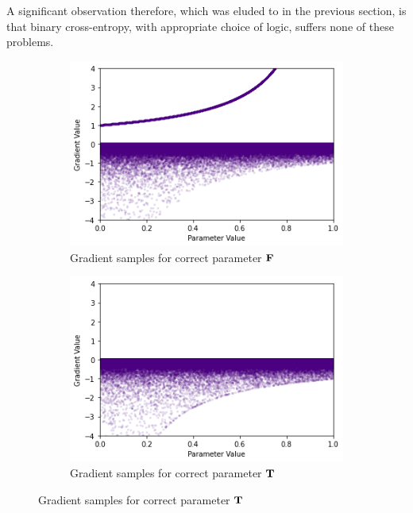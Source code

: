 A significant observation therefore, which was eluded to in the previous section, is that binary cross-entropy, with appropriate choice of logic, suffers none of these problems. 


\begin{figure}[H]
    \centering
    \begin{subfigure}[b]{0.47\textwidth}
        \centering
        \includegraphics[width=\textwidth]{imgs/grad_prod_bce_falseparam_10dim.png}
        \caption{Gradient samples for correct parameter $\textbf{F}$}
        \label{fig:conjgrad1falsebce}
    \end{subfigure}
    \begin{subfigure}[b]{0.47\textwidth}
        \centering
        \includegraphics[width=\textwidth]{imgs/grad_prod_bce_trueparam_10dim.png}
        \caption{Gradient samples for correct parameter $\textbf{T}$}
        \label{fig:conjgrad1truebce}

\end{subfigure}
\end{figure}
